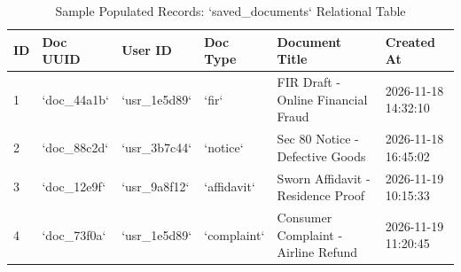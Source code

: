 \begin{table}[H]
\caption{Sample Populated Records: `saved_documents` Relational Table}
\label{tab:sample_documents_data}
\centering
\scriptsize
\begin{tabularx}{\textwidth}{llllp{4.2cm}l}
\toprule
\textbf{ID} & \textbf{Doc UUID} & \textbf{User ID} & \textbf{Doc Type} & \textbf{Document Title} & \textbf{Created At} \\
\midrule
1 & `doc_44a1b` & `usr_1e5d89` & `fir` & FIR Draft - Online Financial Fraud & 2026-11-18 14:32:10 \\
2 & `doc_88c2d` & `usr_3b7c44` & `notice` & Sec 80 Notice - Defective Goods & 2026-11-18 16:45:02 \\
3 & `doc_12e9f` & `usr_9a8f12` & `affidavit` & Sworn Affidavit - Residence Proof & 2026-11-19 10:15:33 \\
4 & `doc_73f0a` & `usr_1e5d89` & `complaint` & Consumer Complaint - Airline Refund & 2026-11-19 11:20:45 \\
\bottomrule
\end{tabularx}
\end{table}
